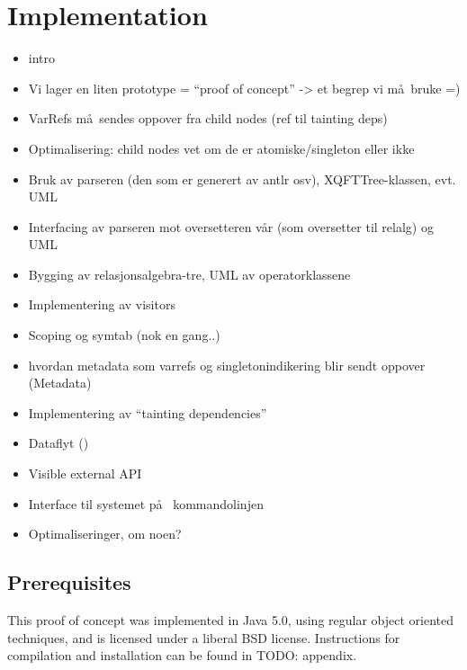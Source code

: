 \chapter{Implementation}
\label{chapter:implementation}

\begin{itemize}
  \item intro
  \item Vi lager en liten prototype = ``proof of concept'' -> et begrep vi m\aa~bruke =)
  \item VarRefs m\aa~sendes oppover fra child nodes (ref til tainting deps)
  \item Optimalisering: child nodes vet om de er atomiske/singleton eller ikke
\end{itemize}

\begin{itemize}
  \item Bruk av parseren (den som er generert av antlr osv), XQFTTree-klassen,
  evt. UML
  \item Interfacing av parseren mot oversetteren v\aa r (som oversetter til
  relalg) og UML
  \item Bygging av relasjonsalgebra-tre, UML av operatorklassene
  \item Implementering av visitors
  \item Scoping og symtab (nok en gang..)
  \item hvordan metadata som varrefs og singletonindikering blir sendt oppover
  (Metadata)
  \item Implementering av ``tainting dependencies''
  \item Dataflyt ()
  \item Visible external API
  \item Interface til systemet p\aa~ kommandolinjen
  \item Optimaliseringer, om noen? 
\end{itemize}

\section{Prerequisites}
This proof of concept was implemented in Java 5.0, using regular object
oriented techniques, and is licensed under a liberal BSD license. Instructions
for compilation and installation can be found in TODO: appendix.








